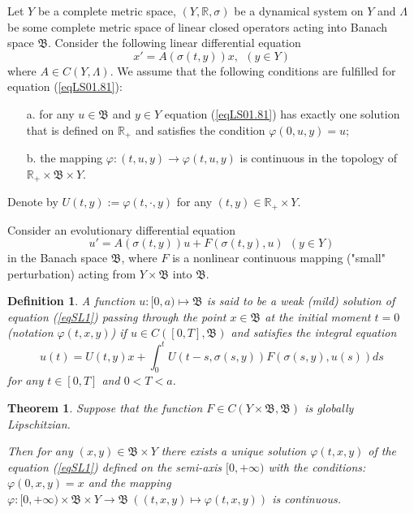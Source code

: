 \documentclass{amsart}%
\newtheorem{theorem}[lemma]{Theorem}
\newtheorem{definition}[lemma]{Definition}
\begin{document}
 Let $Y$ be a complete metric space,
$(Y,\mathbb R,\sigma)$ be a dynamical system on $Y$ and $ \Lambda
$ be some complete metric space of linear closed operators acting
into Banach space $ \mathfrak B $. Consider the following linear
differential equation
\begin{equation}\label{eqLS01.81}
x'=A(\sigma(t,y))x,\  \ (y\in Y)
\end{equation}
where $A\in C(Y,\Lambda)$. We assume that the following conditions
are fulfilled for equation (\ref{eqLS01.81}):
\begin{enumerate}
\item[a.] for any $ u \in \mathfrak B $ and $y\in Y $ equation
(\ref{eqLS01.81}) has exactly one solution that is defined on $
\mathbb R_{+} $ and satisfies the condition $ \varphi (0,u,y) = u
;$ \item[b.] the mapping $ \varphi : (t,u,y) \to \varphi (t,u,y) $
is continuous in the topology of $ \mathbb R_{+} \times \mathfrak
B \times Y$.
\end{enumerate}

Denote by $U(t,y):=\varphi(t,\cdot,y)$ for any $(t,y)\in \mathbb
R_{+}\times Y$.


Consider an evolutionary differential equation
\begin{equation}\label{eqSL1}
u'=A(\sigma(t,y))u + F(\sigma(t,y),u) \ \ (y\in Y)
\end{equation}
in the Banach space $\mathfrak B$, where $F$ is a nonlinear
continuous mapping ("small" perturbation) acting from $Y\times
\mathfrak B$ into $\mathfrak B$.

\begin{definition}
A function $u:[0,a)\mapsto \mathfrak B$ is said to be a weak
(mild) solution of equation (\ref{eqSL1}) passing through the
point $x\in \mathfrak B$ at the initial moment $t=0$ (notation
$\varphi(t,x,y)$) if $u\in C([0,T],\mathfrak B)$ and satisfies the
integral equation
\begin{equation}\label{eqSL3}
u(t)=U(t,y)x+\int_{0}^{t}U(t-s,\sigma(s,y))F(\sigma(s,y),u(s))ds
\end{equation}
for any $t\in [0,T]$ and $0<T<a$.
\end{definition}


\begin{theorem}\label{thLS2.8} \cite[Ch.VI]{Che_2020}
Suppose that the function $F\in C(Y\times \mathfrak B,\mathfrak
B)$ is globally Lipschitzian.

Then for any $(x,y)\in \mathfrak B\times Y$ there exists a unique
solution $\varphi(t,x,y)$ of the equation (\ref{eqSL1}) defined on
the semi-axis $[0,+\infty)$ with the conditions: $\varphi
(0,x,y)=x$ and the mapping $ \varphi : [0,+\infty)\times \mathfrak
B \times Y \to \mathfrak B\ ( (t,x,y)\mapsto \varphi (t,x,y))$ is
continuous.
\end{theorem}
\end{document}
